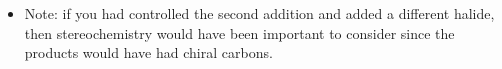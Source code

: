 \begin{itemize}
\begin{itemize}
      \begin{itemize}
        \item Note: if you had controlled the second addition and added a different halide, then stereochemistry would have been important to consider since the products would have had chiral carbons.
      \end{itemize}
      
  \end{itemize}
  
\end{itemize}